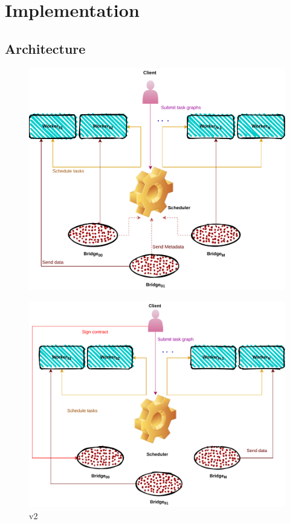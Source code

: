 \section{Implementation}

\cite{deisa}

\subsection{Architecture}
\begin{figure}[tb]\centering
\includegraphics{figures/ArchiectureDeisa.pdf}
\caption{\deisa}
\label{figdeida}
\end{figure}

\begin{figure}[tb]\centering
\includegraphics{figures/ArchiectureDeisaV2.pdf}
\caption{\deisa v2}
\label{figdeidav2}
\end{figure}
